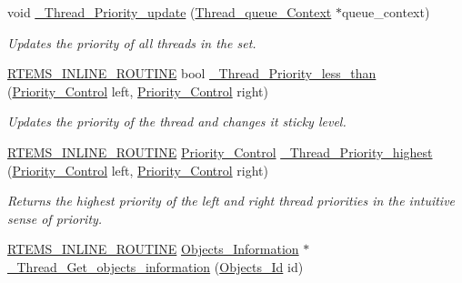 \begin{DoxyCompactItemize}
void \mbox{\hyperlink{group__RTEMSScoreThread_ga424ec96c6cbed5a748565333d5fd7d59}{\+\_\+\+Thread\+\_\+\+Priority\+\_\+update}} (\mbox{\hyperlink{structThread__queue__Context}{Thread\+\_\+queue\+\_\+\+Context}} $\ast$queue\+\_\+context)
\begin{DoxyCompactList}\small\item\em Updates the priority of all threads in the set. \end{DoxyCompactList}\item 
\mbox{\hyperlink{group__RTEMSScoreBaseDefs_gac216239df231d5dbd15e3520b0b9313f}{R\+T\+E\+M\+S\+\_\+\+I\+N\+L\+I\+N\+E\+\_\+\+R\+O\+U\+T\+I\+NE}} bool \mbox{\hyperlink{group__RTEMSScoreThread_gac2b89051f9d18144e0203d8b7e50630d}{\+\_\+\+Thread\+\_\+\+Priority\+\_\+less\+\_\+than}} (\mbox{\hyperlink{group__RTEMSScorePriority_ga59d02b58072d31a9a1cfe644557aefe2}{Priority\+\_\+\+Control}} left, \mbox{\hyperlink{group__RTEMSScorePriority_ga59d02b58072d31a9a1cfe644557aefe2}{Priority\+\_\+\+Control}} right)
\begin{DoxyCompactList}\small\item\em Updates the priority of the thread and changes it sticky level. \end{DoxyCompactList}\item 
\mbox{\hyperlink{group__RTEMSScoreBaseDefs_gac216239df231d5dbd15e3520b0b9313f}{R\+T\+E\+M\+S\+\_\+\+I\+N\+L\+I\+N\+E\+\_\+\+R\+O\+U\+T\+I\+NE}} \mbox{\hyperlink{group__RTEMSScorePriority_ga59d02b58072d31a9a1cfe644557aefe2}{Priority\+\_\+\+Control}} \mbox{\hyperlink{group__RTEMSScoreThread_gad17eecd5728b1ccac519b8c31f641d6b}{\+\_\+\+Thread\+\_\+\+Priority\+\_\+highest}} (\mbox{\hyperlink{group__RTEMSScorePriority_ga59d02b58072d31a9a1cfe644557aefe2}{Priority\+\_\+\+Control}} left, \mbox{\hyperlink{group__RTEMSScorePriority_ga59d02b58072d31a9a1cfe644557aefe2}{Priority\+\_\+\+Control}} right)
\begin{DoxyCompactList}\small\item\em Returns the highest priority of the left and right thread priorities in the intuitive sense of priority. \end{DoxyCompactList}\item 
\mbox{\hyperlink{group__RTEMSScoreBaseDefs_gac216239df231d5dbd15e3520b0b9313f}{R\+T\+E\+M\+S\+\_\+\+I\+N\+L\+I\+N\+E\+\_\+\+R\+O\+U\+T\+I\+NE}} \mbox{\hyperlink{structObjects__Information}{Objects\+\_\+\+Information}} $\ast$ \mbox{\hyperlink{group__RTEMSScoreThread_ga291d97d78d5460ffa5539964e417bb49}{\+\_\+\+Thread\+\_\+\+Get\+\_\+objects\+\_\+information}} (\mbox{\hyperlink{group__RTEMSScoreObject_ga5821f52a51072941bdd603e542d0863e}{Objects\+\_\+\+Id}} id)

\end{DoxyCompactItemize}
